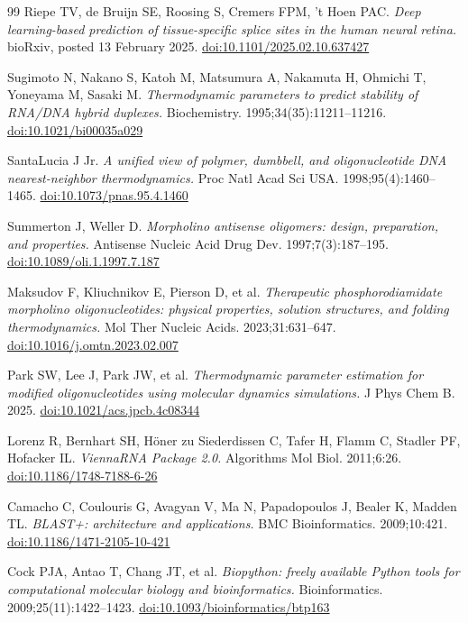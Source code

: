 \documentclass[11pt,a4paper]{article}
\begin{document}
\begin{thebibliography}{99}
Riepe TV, de Bruijn SE, Roosing S, Cremers FPM, 't Hoen PAC.
\emph{Deep learning-based prediction of tissue-specific splice sites in the human neural retina.}
bioRxiv, posted 13 February 2025.
\href{https://doi.org/10.1101/2025.02.10.637427}{doi:10.1101/2025.02.10.637427}

Sugimoto N, Nakano S, Katoh M, Matsumura A, Nakamuta H, Ohmichi T, Yoneyama M, Sasaki M.
\emph{Thermodynamic parameters to predict stability of RNA/DNA hybrid duplexes.}
Biochemistry. 1995;34(35):11211--11216.
\href{https://doi.org/10.1021/bi00035a029}{doi:10.1021/bi00035a029}

SantaLucia J Jr. \emph{A unified view of polymer, dumbbell, and oligonucleotide DNA
nearest-neighbor thermodynamics.} Proc Natl Acad Sci USA. 1998;95(4):1460--1465.
\href{https://doi.org/10.1073/pnas.95.4.1460}{doi:10.1073/pnas.95.4.1460}

Summerton J, Weller D. \emph{Morpholino antisense oligomers: design, preparation, and properties.}
Antisense Nucleic Acid Drug Dev. 1997;7(3):187--195.
\href{https://doi.org/10.1089/oli.1.1997.7.187}{doi:10.1089/oli.1.1997.7.187}

Maksudov F, Kliuchnikov E, Pierson D, et al.
\emph{Therapeutic phosphorodiamidate morpholino oligonucleotides: physical properties, solution
structures, and folding thermodynamics.} Mol Ther Nucleic Acids. 2023;31:631--647.
\href{https://doi.org/10.1016/j.omtn.2023.02.007}{doi:10.1016/j.omtn.2023.02.007}

Park SW, Lee J, Park JW, et al. \emph{Thermodynamic parameter estimation for modified
oligonucleotides using molecular dynamics simulations.} J Phys Chem B. 2025.
\href{https://doi.org/10.1021/acs.jpcb.4c08344}{doi:10.1021/acs.jpcb.4c08344}

Lorenz R, Bernhart SH, H\"oner zu Siederdissen C, Tafer H, Flamm C, Stadler PF, Hofacker IL.
\emph{ViennaRNA Package 2.0.} Algorithms Mol Biol. 2011;6:26.
\href{https://doi.org/10.1186/1748-7188-6-26}{doi:10.1186/1748-7188-6-26}

Camacho C, Coulouris G, Avagyan V, Ma N, Papadopoulos J, Bealer K, Madden TL.
\emph{BLAST+: architecture and applications.} BMC Bioinformatics. 2009;10:421.
\href{https://doi.org/10.1186/1471-2105-10-421}{doi:10.1186/1471-2105-10-421}

Cock PJA, Antao T, Chang JT, et al. \emph{Biopython: freely available Python tools for computational
molecular biology and bioinformatics.} Bioinformatics. 2009;25(11):1422--1423.
\href{https://doi.org/10.1093/bioinformatics/btp163}{doi:10.1093/bioinformatics/btp163}


\end{thebibliography}
\end{document}
